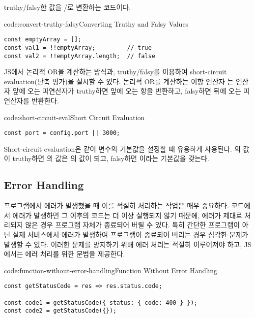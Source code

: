 \는 truthy/falsy한 값을 /로 변환하는 코드이다.

\begin{codeenv}{code:convert-truthy-falsy}{Converting Truthy and Falsy Values}\begin{verbatim}
const emptyArray = [];
const val1 = !!emptyArray;         // true
const val2 = !!emptyArray.length;  // false
\end{verbatim}
\end{codeenv}

JS에서 논리적 OR을 계산하는 방식과, truthy/falsy를 이용하여 short-circuit evaluation(단축 평가)을 실시할 수 있다. 논리적 OR를 계산하는 이항 연산자 \cd{||}는 연산자 앞에 오는 피연산자가 truthy하면 앞에 오는 항을 반환하고, falsy하면 뒤에 오는 피연산자를 반환한다.

\begin{codeenv}{code:short-circuit-eval}{Short Circuit Evaluation}\begin{verbatim}
const port = config.port || 3000;
\end{verbatim}
\end{codeenv}

Short-circuit evaluation은 \과 같이 변수의 기본값을 설정할 때 유용하게 사용된다. 의 값이 truthy하면 의 값은 의 값이 되고, falsy하면 이라는 기본값을 갖는다.
\newpage

\subsection*{Error Handling}

프로그램에서 에러가 발생했을 때 이를 적절히 처리하는 작업은 매우 중요하다. 코드에서 에러가 발생하면 그 이후의 코드는 더 이상 실행되지 않기 때문에, 에러가 제대로 처리되지 않은 경우 프로그램 자체가 종료되어 버릴 수 있다. 특히 간단한 프로그램이 아닌 실제 서비스에서 에러가 발생하여 프로그램이 종료되어 버리는 경우 심각한 문제가 발생할 수 있다. 이러한 문제를 방지하기 위해 에러 처리는 적절히 이루어져야 하고, JS에서는 에러 처리를 위한 문법을 제공한다.

\begin{codeenv}{code:function-without-error-handling}{Function Without Error Handling}\begin{verbatim}
const getStatusCode = res => res.status.code;

const code1 = getStatusCode({ status: { code: 400 } });
const code2 = getStatusCode({});
\end{verbatim}
\end{codeenv}

